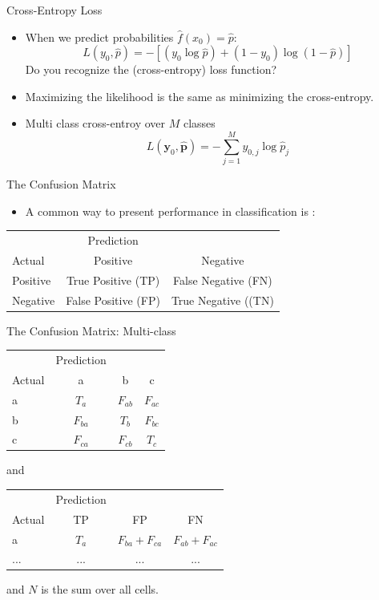 \documentclass[10pt]{beamer}
\begin{document}
\begin{frame}{Cross-Entropy Loss}

\begin{itemize}
\item When we predict probabilities $\hat{f}(x_0)=\hat{p}$:
\[
L(y_0, \hat{p}) = - [ (y_0 \log{\hat{p}}) + (1 - y_0) \log{(1- \hat{p})} ]
\]
 Do you recognize the (cross-entropy) loss function?
\pause
\item Maximizing the likelihood is the same as minimizing the cross-entropy. \pause
\item Multi class cross-entroy over $M$ classes
\[
L(\mathbf{y}_0, \hat{\mathbf{p}}) = - \sum^M_{j=1} y_{0,j} \log{\hat{p}_j}
\]
\end{itemize}

\end{frame}


\begin{frame}{The Confusion Matrix}

\begin{itemize}
\item A common way to present performance in classification is :
\end{itemize}
\centering
\begin{tabular}{lcc}
  & Prediction &  \\
  Actual & Positive & Negative \\
  Positive & True Positive (TP) & False Negative (FN) \\
  Negative & False Positive (FP) & True Negative ((TN)
\end{tabular}


\end{frame}

\begin{frame}{The Confusion Matrix: Multi-class}

\centering
\begin{tabular}{lccc}
  & Prediction &  \\
  Actual & a & b & c \\
  a & $T_a$ & $F_{ab}$ & $F_{ac}$ \\
  b & $F_{ba}$ & $T_b$ & $F_{bc}$ \\
  c & $F_{ca}$ & $F_{cb}$ & $T_c$ \\
\end{tabular}
and
\centering
\begin{tabular}{lccc}
  & Prediction &  \\
  Actual & TP & FP & FN \\
  a & $T_a$ & $F_{ba} + F_{ca}$ & $F_{ab} + F_{ac}$ \\
  ... & ... & ... & ...
\end{tabular}
and $N$ is the sum over all cells.



\end{frame}
\end{document}
